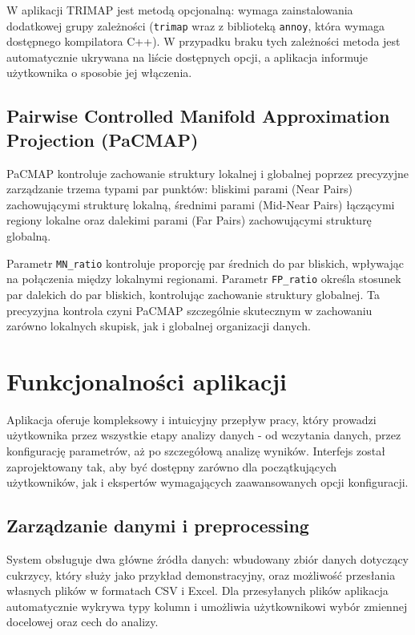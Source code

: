 \documentclass[a4paper, 12pt]{article}
\begin{document}
W aplikacji TRIMAP jest metodą opcjonalną: wymaga zainstalowania dodatkowej grupy zależności (\texttt{trimap} wraz z biblioteką \texttt{annoy}, która wymaga dostępnego kompilatora C++). W przypadku braku tych zależności metoda jest automatycznie ukrywana na liście dostępnych opcji, a aplikacja informuje użytkownika o sposobie jej włączenia.

\subsection{Pairwise Controlled Manifold Approximation Projection (PaCMAP)}

PaCMAP kontroluje zachowanie struktury lokalnej i globalnej poprzez precyzyjne zarządzanie trzema typami par punktów: bliskimi parami (Near Pairs) zachowującymi strukturę lokalną, średnimi parami (Mid-Near Pairs) łączącymi regiony lokalne oraz dalekimi parami (Far Pairs) zachowującymi strukturę globalną.

Parametr \texttt{MN\_ratio} kontroluje proporcję par średnich do par bliskich, wpływając na połączenia między lokalnymi regionami. Parametr \texttt{FP\_ratio} określa stosunek par dalekich do par bliskich, kontrolując zachowanie struktury globalnej. Ta precyzyjna kontrola czyni PaCMAP szczególnie skutecznym w zachowaniu zarówno lokalnych skupisk, jak i globalnej organizacji danych.

\section{Funkcjonalności aplikacji}

Aplikacja oferuje kompleksowy i intuicyjny przepływ pracy, który prowadzi użytkownika przez wszystkie etapy analizy danych - od wczytania danych, przez konfigurację parametrów, aż po szczegółową analizę wyników. Interfejs został zaprojektowany tak, aby być dostępny zarówno dla początkujących użytkowników, jak i ekspertów wymagających zaawansowanych opcji konfiguracji.

\subsection{Zarządzanie danymi i preprocessing}

System obsługuje dwa główne źródła danych: wbudowany zbiór danych dotyczący cukrzycy, który służy jako przykład demonstracyjny, oraz możliwość przesłania własnych plików w formatach CSV i Excel. Dla przesyłanych plików aplikacja automatycznie wykrywa typy kolumn i umożliwia użytkownikowi wybór zmiennej docelowej oraz cech do analizy.
\end{document}
